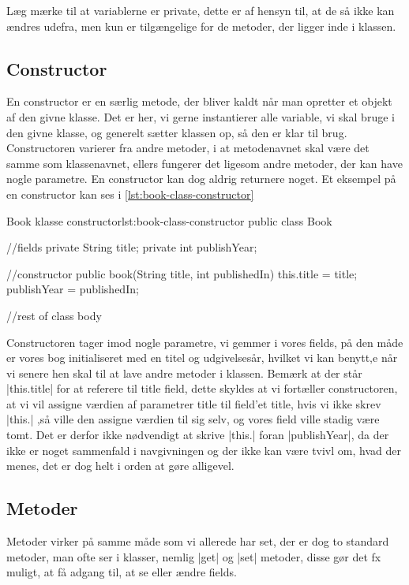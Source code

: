 Læg mærke til at variablerne er private, dette er af hensyn til, at de så ikke kan ændres udefra, men kun er tilgængelige for de metoder, der ligger inde i klassen.

\subsection{Constructor}

En constructor er en særlig metode, der bliver kaldt når man opretter et objekt af den givne klasse. Det er her, vi gerne instantierer alle variable, vi skal bruge i den givne klasse, og generelt sætter klassen op, så den er klar til brug. Constructoren varierer fra andre metoder, i at metodenavnet skal være det samme som klassenavnet, ellers fungerer det ligesom andre metoder, der kan have nogle parametre. En constructor kan dog aldrig returnere noget. Et eksempel på en constructor kan ses i \autoref{lst:book-class-constructor}

\begin{JavaCode}{Book klasse constructor}{lst:book-class-constructor}
	public class Book {
		//fields
		private String title;
		private int publishYear;
		
		//constructor
		public book(String title, int publishedIn) {
			this.title = title;
			publishYear = publishedIn;
		}
		
		//rest of class body
	}
\end{JavaCode}

Constructoren tager imod nogle parametre, vi gemmer i vores fields, på den måde er vores bog initialiseret med en titel og udgivelsesår, hvilket vi kan benytt,e når vi senere hen skal til at lave andre metoder i klassen. Bemærk at der står \JavaInline|this.title| for at referere til title field, dette skyldes at vi fortæller constructoren, at vi vil assigne værdien af parametrer title til field'et title, hvis vi ikke skrev \JavaInline|this.| ,så ville den assigne værdien til sig selv, og vores field ville stadig være tomt. Det er derfor ikke nødvendigt at skrive \JavaInline|this.| foran \JavaInline|publishYear|, da der ikke er noget sammenfald i navgivningen og der ikke kan være tvivl om, hvad der menes, det er dog helt i orden at gøre alligevel.

\subsection{Metoder}

Metoder virker på samme måde som vi allerede har set, der er dog to standard metoder, man ofte ser i klasser, nemlig \JavaInline|get| og \JavaInline|set| metoder, disse gør det fx muligt, at få adgang til, at se eller ændre fields. 

